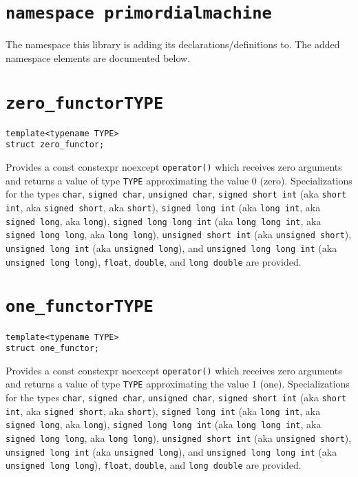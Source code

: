 \documentclass[oneside]{book}
\begin{document}
\section{\texttt{namespace primordialmachine}}
The namespace this library is adding its declarations/definitions to.
The added namespace elements are documented below.

\section{\texttt{zero\_functor\textlangle TYPE\textrangle}}
\begin{verbatim}
template<typename TYPE>
struct zero_functor;
\end{verbatim}
Provides a const constexpr noexcept \texttt{operator()} which receives zero arguments and returns a
value of type \texttt{TYPE} approximating the value $0$ (zero).
Specializations for the types
\texttt{char},
\texttt{signed char},
\texttt{unsigned char},
\texttt{signed short int}       (aka \texttt{short int},     aka \texttt{signed short},     aka \texttt{short}),
\texttt{signed long int}        (aka \texttt{long int},      aka \texttt{signed long},      aka \texttt{long}),
\texttt{signed long long int}   (aka \texttt{long long int}, aka \texttt{signed long long}, aka \texttt{long long}),
\texttt{unsigned short int}     (aka \texttt{unsigned short}),
\texttt{unsigned long int}      (aka \texttt{unsigned long}), and
\texttt{unsigned long long int} (aka \texttt{unsigned long long}),
\texttt{float},
\texttt{double}, and
\texttt{long double}
are provided.

\section{\texttt{one\_functor\textlangle TYPE\textrangle}}
\begin{verbatim}
template<typename TYPE>
struct one_functor;
\end{verbatim}
Provides a const constexpr noexcept \texttt{operator()} which receives zero arguments and returns a
value of type \texttt{TYPE} approximating the value $1$ (one).
Specializations for the types
\texttt{char},
\texttt{signed char},
\texttt{unsigned char},
\texttt{signed short int}       (aka \texttt{short int},     aka \texttt{signed short},     aka \texttt{short}),
\texttt{signed long int}        (aka \texttt{long int},      aka \texttt{signed long},      aka \texttt{long}),
\texttt{signed long long int}   (aka \texttt{long long int}, aka \texttt{signed long long}, aka \texttt{long long}),
\texttt{unsigned short int}     (aka \texttt{unsigned short}),
\texttt{unsigned long int}      (aka \texttt{unsigned long}), and
\texttt{unsigned long long int} (aka \texttt{unsigned long long}),
\texttt{float},
\texttt{double}, and
\texttt{long double}
are provided.
\end{document}
